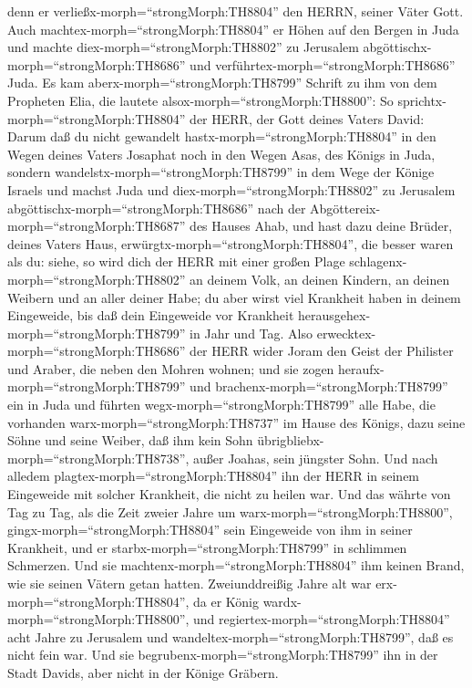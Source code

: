 denn er verließx-morph=``strongMorph:TH8804'' den HERRN, seiner Väter
Gott.  Auch machtex-morph=``strongMorph:TH8804'' er Höhen
auf den Bergen in Juda und machte diex-morph=``strongMorph:TH8802'' zu
Jerusalem abgöttischx-morph=``strongMorph:TH8686'' und
verführtex-morph=``strongMorph:TH8686'' Juda.  Es kam
aberx-morph=``strongMorph:TH8799'' Schrift zu ihm von dem Propheten
Elia, die lautete alsox-morph=``strongMorph:TH8800'': So
sprichtx-morph=``strongMorph:TH8804'' der HERR, der Gott deines Vaters
David: Darum daß du nicht gewandelt hastx-morph=``strongMorph:TH8804''
in den Wegen deines Vaters Josaphat noch in den Wegen Asas, des Königs
in Juda,  sondern wandelstx-morph=``strongMorph:TH8799'' in
dem Wege der Könige Israels und machst Juda und
diex-morph=``strongMorph:TH8802'' zu Jerusalem
abgöttischx-morph=``strongMorph:TH8686'' nach der
Abgöttereix-morph=``strongMorph:TH8687'' des Hauses Ahab, und hast dazu
deine Brüder, deines Vaters Haus, erwürgtx-morph=``strongMorph:TH8804'',
die besser waren als du:  siehe, so wird dich der HERR mit
einer großen Plage schlagenx-morph=``strongMorph:TH8802'' an deinem
Volk, an deinen Kindern, an deinen Weibern und an aller deiner Habe;
 du aber wirst viel Krankheit haben in deinem Eingeweide,
bis daß dein Eingeweide vor Krankheit
herausgehex-morph=``strongMorph:TH8799'' in Jahr und Tag. 
Also erwecktex-morph=``strongMorph:TH8686'' der HERR wider Joram den
Geist der Philister und Araber, die neben den Mohren wohnen;
 und sie zogen heraufx-morph=``strongMorph:TH8799'' und
brachenx-morph=``strongMorph:TH8799'' ein in Juda und führten
wegx-morph=``strongMorph:TH8799'' alle Habe, die vorhanden
warx-morph=``strongMorph:TH8737'' im Hause des Königs, dazu seine Söhne
und seine Weiber, daß ihm kein Sohn
übrigbliebx-morph=``strongMorph:TH8738'', außer Joahas, sein jüngster
Sohn.  Und nach alledem
plagtex-morph=``strongMorph:TH8804'' ihn der HERR in seinem Eingeweide
mit solcher Krankheit, die nicht zu heilen war.  Und das
währte von Tag zu Tag, als die Zeit zweier Jahre um
warx-morph=``strongMorph:TH8800'', gingx-morph=``strongMorph:TH8804''
sein Eingeweide von ihm in seiner Krankheit, und er
starbx-morph=``strongMorph:TH8799'' in schlimmen Schmerzen. Und sie
machtenx-morph=``strongMorph:TH8804'' ihm keinen Brand, wie sie seinen
Vätern getan hatten.  Zweiunddreißig Jahre alt war
erx-morph=``strongMorph:TH8804'', da er König
wardx-morph=``strongMorph:TH8800'', und
regiertex-morph=``strongMorph:TH8804'' acht Jahre zu Jerusalem und
wandeltex-morph=``strongMorph:TH8799'', daß es nicht fein war. Und sie
begrubenx-morph=``strongMorph:TH8799'' ihn in der Stadt Davids, aber
nicht in der Könige Gräbern.

